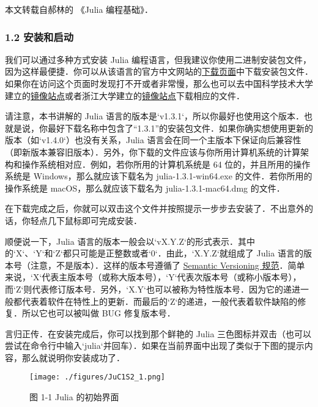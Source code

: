 
本文转载自郝林的 《Julia 编程基础》．

\subsubsection{1.2 安装和启动}

我们可以通过多种方式安装 Julia 编程语言，但我建议你使用二进制安装包文件，因为这样最便捷．你可以从该语言的官方中文网站的\href{https://cn.julialang.org/downloads/}{下载页面}中下载安装包文件．如果你在访问这个页面时发现打不开或者非常慢，那么也可以去中国科学技术大学建立的\href{https://mirrors.zju.edu.cn/julia/releases/}{镜像站点}或者浙江大学建立的\href{https://mirrors.ustc.edu.cn/julia/releases/}{镜像站点}下载相应的文件．

请注意，本书讲解的 Julia 语言的版本是`v1.3.1`，所以你最好也使用这个版本．也就是说，你最好下载名称中包含了“1.3.1”的安装包文件．如果你确实想使用更新的版本（如`v1.4.0`）也没有关系，Julia 语言会在同一个主版本下保证向后兼容性（即新版本兼容旧版本）．另外，你下载的文件应该与你所用计算机系统的计算架构和操作系统相对应．例如，若你所用的计算机系统是 64 位的，并且所用的操作系统是 Windows，那么就应该下载名为 julia-1.3.1-win64.exe 的文件．若你所用的操作系统是 macOS，那么就应该下载名为 julia-1.3.1-mac64.dmg 的文件．

在下载完成之后，你就可以双击这个文件并按照提示一步步去安装了．不出意外的话，你轻点几下鼠标即可完成安装．

顺便说一下，Julia 语言的版本一般会以`vX.Y.Z`的形式表示．其中的`X`、`Y`和`Z`都只可能是正整数或者`0`．由此，`X.Y.Z`就组成了 Julia 语言的版本号（注意，不是版本）．这样的版本号遵循了 \href{https://semver.org}{Semantic Versioning 规范}．简单来说，`X`代表主版本号（或称大版本号），`Y`代表次版本号（或称小版本号），而`Z`则代表修订版本号．另外，`X.Y`也可以被称为特性版本号．因为它的递进一般都代表着软件在特性上的更新．而最后的`Z`的递进，一般代表着软件缺陷的修复．所以它也可以被叫做 BUG 修复版本号．

言归正传．在安装完成后，你可以找到那个鲜艳的 Julia 三色图标并双击（也可以尝试在命令行中输入`julia`并回车）．如果在当前界面中出现了类似于下图的提示内容，那么就说明你安装成功了．

\begin{figure}[ht]
\centering
\texttt{[image: ./figures/JuC1S2\_1.png]}
\caption{图 1-1 Julia 的初始界面} \label{JuC1S2_fig1}
\end{figure}

